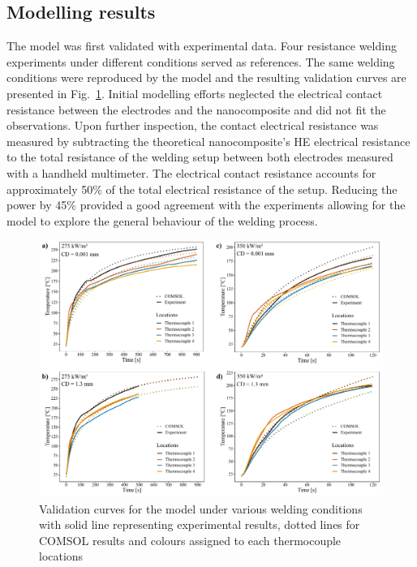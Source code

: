 \documentclass[review,times,sagev,doublespace]{sagej}
\begin{document}
	\subsection{Modelling results}

The model was first validated with experimental data. 
Four resistance welding experiments under different conditions served as references. 
The same welding conditions were reproduced by the model and the resulting validation curves are presented in \mbox{Fig.~\ref{fig:Fig4}}. 
Initial modelling efforts neglected the electrical contact resistance between the electrodes and the nanocomposite and did not fit the observations. 
Upon further inspection, the contact electrical resistance was measured by subtracting the theoretical nanocomposite’s HE electrical resistance to the total resistance of the welding setup between both electrodes measured with a handheld multimeter. 
The electrical contact resistance accounts for approximately 50\% of the total electrical resistance of the setup. 
Reducing the power by 45\% provided a good agreement with the experiments allowing for the model to explore the general behaviour of the welding process. 

\begin{figure}[ht]
	\center
	\includegraphics[width=\textwidth]{Fig4}
	\caption{Validation curves for the model under various welding conditions with solid line representing experimental results, dotted lines for COMSOL results and colours assigned to each thermocouple locations \cite{Brassard2019b}}
	\label{fig:Fig4}
\end{figure} 
\end{document}
